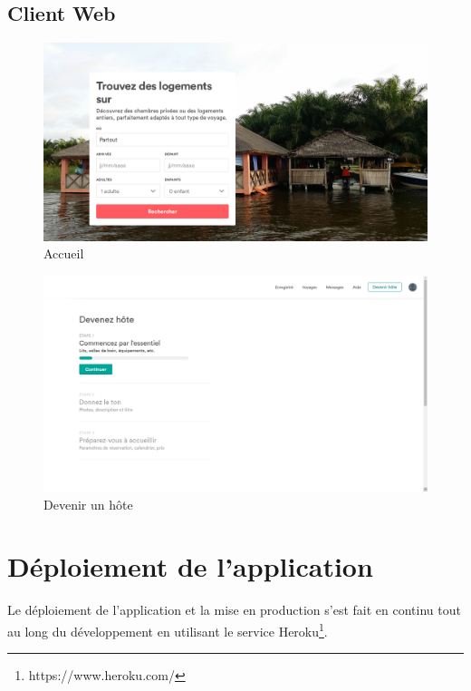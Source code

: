 \subsection{Client Web}
\begin{figure}[H]
	\begin{center}
		\includegraphics[width=17cm]{images/screen/web/1.png}
	\end{center}
	\caption{Accueil}
\end{figure}
\begin{figure}[H]
	\begin{center}
		\includegraphics[width=17cm]{images/screen/web/3.png}
	\end{center}
	\caption{Devenir un hôte}
\end{figure}

\section{Déploiement de l'application}
Le déploiement de l’application et la mise en production s’est fait en continu tout au long du développement en utilisant le service Heroku\footnote{https://www.heroku.com/}.
